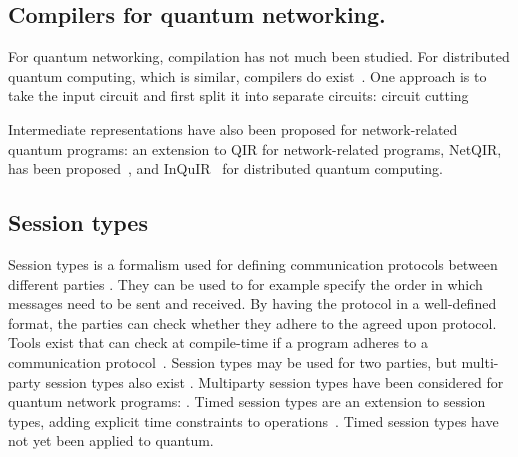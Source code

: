 


\subsection{Compilers for quantum networking.}
For quantum networking, compilation has not much been studied.
For distributed quantum computing, which is similar, compilers do exist~\cite{ferrari_compiler_2021, chatterjee_qurzon_2022, cuomo_optimized_2023, ferrari_modular_2023}.
One approach is to take the input circuit and first split it into separate circuits: circuit cutting~\cite{chatterjee_qurzon_2022}

Intermediate representations have also been proposed for network-related quantum programs:
an extension to QIR for network-related programs, NetQIR, has been proposed~\cite{vazquez-perez_netqir_2024}, and InQuIR~\cite{nishio_inquir_2023} for distributed quantum computing.


\subsection{Session types}
\label{compiler:sec:session-types}

Session types is a formalism used for defining communication protocols between different parties \cite{honda_language_1998}.
They can be used to for example specify the order in which messages need to be sent and received.
By having the protocol in a well-defined format, the parties can check whether they adhere to the agreed upon protocol.
Tools exist that can check at compile-time if a program adheres to a communication protocol~\cite{davidson_model_nodate, ardeshir-larijani_automated_2018}.
Session types may be used for two parties, but multi-party session types also exist \cite{honda_multiparty_2016}.
Multiparty session types have been considered for quantum network programs: \cite{lanese_towards_2024}.
Timed session types are an extension to session types, adding explicit time constraints to operations~\cite{bartoletti_timed_2017}.
Timed session types have not yet been applied to quantum.


